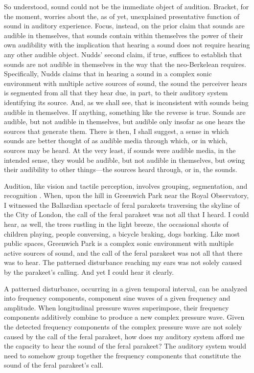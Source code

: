 So understood, sound could not be the immediate object of audition. Bracket, for the moment, worries about the, as of yet, unexplained presentative function of sound in auditory experience. Focus, instead, on the prior claim that sounds are audible in themselves, that sounds contain within themselves the power of their own audibility with the implication that hearing a sound does not require hearing any other audible object. Nudds' second claim, if true, suffices to establish that sounds are not audible in themselves in the way that the neo-Berkelean requires. Specifically, Nudds claims that in hearing a sound in a complex sonic environment with multiple active sources of sound, the sound the perceiver hears is segmented from all that they hear due, in part, to their auditory system identifying its source. And, as we shall see, that is inconsistent with sounds being audible in themselves. If anything, something like the reverse is true. Sounds are audible, but not audible in themselves, but audible only insofar as one hears the sources that generate them. There is then, I shall suggest, a sense in which sounds are better thought of as audible media through which, or in which, sources may be heard. At the very least, if sounds were audible media, in the intended sense, they would be audible, but not audible in themselves, but owing their audibility to other things---the sources heard through, or in, the sounds.

Audition, like vision and tactile perception, involves grouping, segmentation, and recognition \citep{Bregman:1990aa}. When, upon the hill in Greenwich Park near the Royal Observatory, I witnessed the Ballardian spectacle of feral parakeets traversing the skyline of the City of London, the call of the feral parakeet was not all that I heard. I could hear, as well, the trees rustling in the light breeze, the occasional shouts of children playing, people conversing, a bicycle braking, dogs barking. Like most public spaces, Greenwich Park is a complex sonic environment with multiple active sources of sound, and the call of the feral parakeet was not all that there was to hear. The patterned disturbance reaching my ears was not solely caused by the parakeet's calling. And yet I could hear it clearly.

A patterned disturbance, occurring in a given temporal interval, can be analyzed into frequency components, component sine waves of a given frequency and amplitude. When longitudinal pressure waves superimpose, their frequency components additively combine to produce a new complex pressure wave. Given the detected frequency components of the complex pressure wave are not solely caused by the call of the feral parakeet, how does my auditory system afford me the capacity to hear the sound of the feral parakeet? The auditory system would need to somehow group together the frequency components that constitute the sound of the feral parakeet's call.

